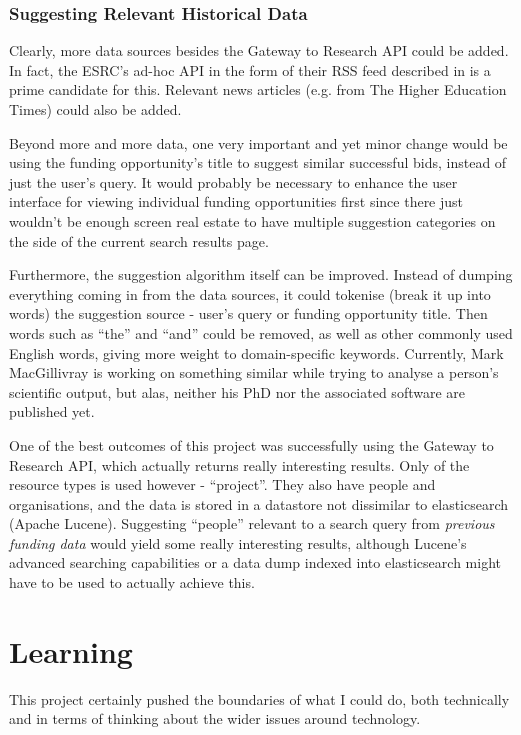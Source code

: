 \subsubsection{Suggesting Relevant Historical Data}

Clearly, more data sources besides the Gateway to Research API could be added. In fact, the ESRC's ad-hoc API in the form of their RSS feed described in  is a prime candidate for this. Relevant news articles (e.g. from The Higher Education Times) could also be added.

Beyond more and more data, one very important and yet minor change would be using the funding opportunity's title to suggest similar successful bids, instead of just the user's query. It would probably be necessary to enhance the user interface for viewing individual funding opportunities first since there just wouldn't be enough screen real estate to have multiple suggestion categories on the side of the current search results page.

Furthermore, the suggestion algorithm itself can be improved. Instead of dumping everything coming in from the data sources, it could tokenise (break it up into words) the suggestion source - user's query or funding opportunity title. Then words such as ``the'' and ``and'' could be removed, as well as other commonly used English words, giving more weight to domain-specific keywords. Currently, Mark MacGillivray \cite{mark} is working on something similar while trying to analyse a person's scientific output, but alas, neither his PhD nor the associated software are published yet.

One of the best outcomes of this project was successfully using the Gateway to Research API, which actually returns really interesting results. Only of the resource types is used however - ``project''. They also have people and organisations, and the data is stored in a datastore not dissimilar to elasticsearch (Apache Lucene). Suggesting ``people'' relevant to a search query from \emph{previous funding data} would yield some really interesting results, although Lucene's advanced searching capabilities or a data dump indexed into elasticsearch might have to be used to actually achieve this.

\section{Learning}

This project certainly pushed the boundaries of what I could do, both technically and in terms of thinking about the wider issues around technology.

